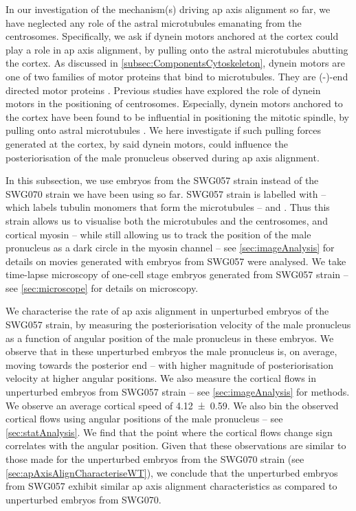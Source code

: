 In our investigation of the mechanism(s) driving \ac{ap} axis alignment so far, we have neglected any role of the astral microtubules emanating from the centrosomes. Specifically, we ask if dynein motors anchored at the cortex could play a role in \ac{ap} axis alignment, by pulling onto the astral microtubules abutting the cortex. As discussed in \autoref{subsec:ComponentsCytoskeleton}, dynein motors are one of two families of motor proteins that bind to microtubules. They are (-)-end directed motor proteins \citep{de2016dynein}. Previous studies have explored the role of dynein motors in the positioning of centrosomes. Especially, dynein motors anchored to the cortex have been found to be influential in positioning the mitotic spindle, by pulling onto astral microtubules \citep{de2016dynein,gotta2001distinct,nguyen2007coupling,colombo2003translation}. We here investigate if such pulling forces generated at the cortex, by said dynein motors, could influence the posteriorisation of the male pronucleus observed during \ac{ap} axis alignment.

In this subsection, we use embryos from the SWG057 strain instead of the SWG070 strain we have been using so far. SWG057 strain is labelled with  -- which labels tubulin monomers that form the microtubules -- and . Thus this strain allows us to visualise both the microtubules and the centrosomes, and cortical myosin -- while still allowing us to track the position of the male pronucleus as a dark circle in the myosin channel -- see \autoref{sec:imageAnalysis} for details on movies generated with embryos from SWG057 were analysed. We take time-lapse microscopy of one-cell stage embryos generated from SWG057 strain -- see \autoref{sec:microscope} for details on microscopy. 

We characterise the rate of \ac{ap} axis alignment in unperturbed embryos of the SWG057 strain, by measuring the posteriorisation velocity of the male pronucleus as a function of angular position of the male pronucleus in these embryos. We observe that in these unperturbed embryos the male pronucleus is, on average, moving towards the posterior end -- with higher magnitude of posteriorisation velocity at higher angular positions. We also measure the cortical flows in unperturbed embryos from SWG057 strain -- see \autoref{sec:imageAnalysis} for methods. We observe an average cortical speed of \SI{4.12 +- 0.59}{\unitCrtxVel}. We also bin the observed cortical flows using angular positions of the male pronucleus -- see \autoref{sec:statAnalysis}. We find that the point where the cortical flows change sign correlates with the angular position. Given that these observations are similar to those made for the unperturbed embryos from the SWG070 strain (see \autoref{sec:apAxisAlignCharacteriseWT}), we conclude that the unperturbed embryos from SWG057 exhibit similar \ac{ap} axis alignment characteristics as compared to unperturbed embryos from SWG070.


